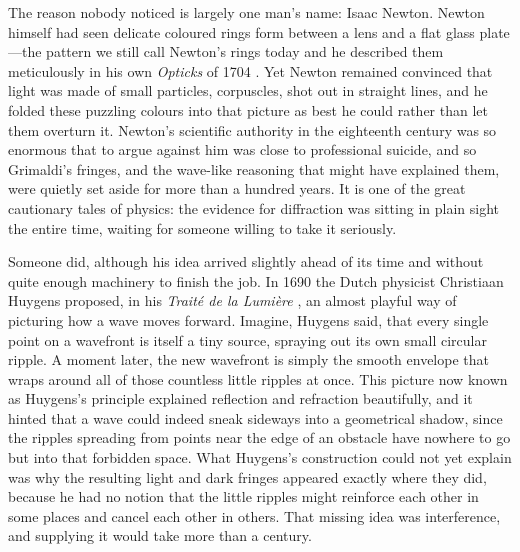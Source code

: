 	The reason nobody noticed is largely one man's name: Isaac Newton. Newton himself had seen delicate coloured rings form between a lens and a flat glass plate---the pattern we still call Newton's rings today and he described them meticulously in his own \textit{Opticks} of 1704 \cite{newton1704opticks}. Yet Newton remained convinced that light was made of small particles, corpuscles, shot out in straight lines, and he folded these puzzling colours into that picture as best he could rather than let them overturn it. Newton's scientific authority in the eighteenth century was so enormous that to argue against him was close to professional suicide, and so Grimaldi's fringes, and the wave-like reasoning that might have explained them, were quietly set aside for more than a hundred years. It is one of the great cautionary tales of physics: the evidence for diffraction was sitting in plain sight the entire time, waiting for someone willing to take it seriously.

	Someone did, although his idea arrived slightly ahead of its time and without quite enough machinery to finish the job. In 1690 the Dutch physicist Christiaan Huygens proposed, in his \textit{Traité de la Lumière} \cite{huygens1690traite}, an almost playful way of picturing how a wave moves forward. Imagine, Huygens said, that every single point on a wavefront is itself a tiny source, spraying out its own small circular ripple. A moment later, the new wavefront is simply the smooth envelope that wraps around all of those countless little ripples at once. This picture now known as Huygens's principle explained reflection and refraction beautifully, and it hinted that a wave could indeed sneak sideways into a geometrical shadow, since the ripples spreading from points near the edge of an obstacle have nowhere to go but into that forbidden space. What Huygens's construction could not yet explain was why the resulting light and dark fringes appeared exactly where they did, because he had no notion that the little ripples might reinforce each other in some places and cancel each other in others. That missing idea was interference, and supplying it would take more than a century.


